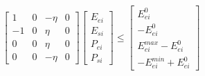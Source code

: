 \documentclass[11pt]{article} %
\begin{document}
\begin{align} 
    \begin{bmatrix}
        1 & 0 & -\eta  & 0\\
        -1 & 0 & \eta & 0\\
        0 & 0 & \eta & 0\\
        0 & 0 & -\eta & 0
    \end{bmatrix} 
    \begin{bmatrix}
        E_{ei}\\
        E_{si}\\
        P_{ei}\\
        P_{si}
    \end{bmatrix} \leq
    \begin{bmatrix}
        E_{ei}^{0}\\
        -E_{ei}^{0}\\
        E_{ei}^{max} - E_{ei}^{0}\\
        -E_{ei}^{min} + E_{ei}^{0}
    \end{bmatrix}
\end{align}
\end{document}
